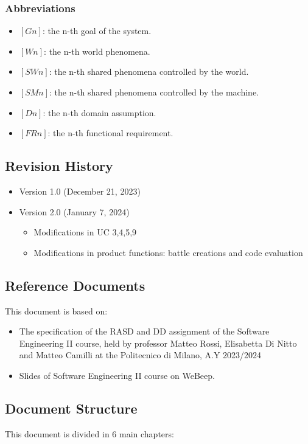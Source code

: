 \documentclass{article}
\begin{document}
\subsubsection{Abbreviations}
\begin{itemize}
    \item \textbf{$[Gn]$}: the n-th goal of the system.
    \item \textbf{$[Wn]$}: the n-th world phenomena.
    \item \textbf{$[SWn]$}: the n-th shared phenomena controlled by the world.
    \item \textbf{$[SMn]$}: the n-th shared phenomena controlled by the machine.
    \item \textbf{$[Dn]$}: the n-th domain assumption.
    \item \textbf{$[FRn]$}: the n-th functional requirement.
\end{itemize}

\subsection{Revision History}
\begin{itemize}
    \item Version 1.0 (December 21, 2023)
    \item Version 2.0 (January 7, 2024)
    \begin{itemize}
        \item Modifications in UC 3,4,5,9
        \item Modifications in product functions: battle creations and code evaluation
    \end{itemize}
\end{itemize}

\subsection{Reference Documents}
This document is based on:
\begin{itemize}
    \item The specification of the RASD and DD assignment of the Software Engineering II course, held by professor Matteo Rossi, Elisabetta Di Nitto and Matteo Camilli at the Politecnico di Milano, A.Y 2023/2024
    \item Slides of Software Engineering II course on WeBeep.
\end{itemize}

\subsection{Document Structure}
This document is divided in 6 main chapters: \\
\end{document}
